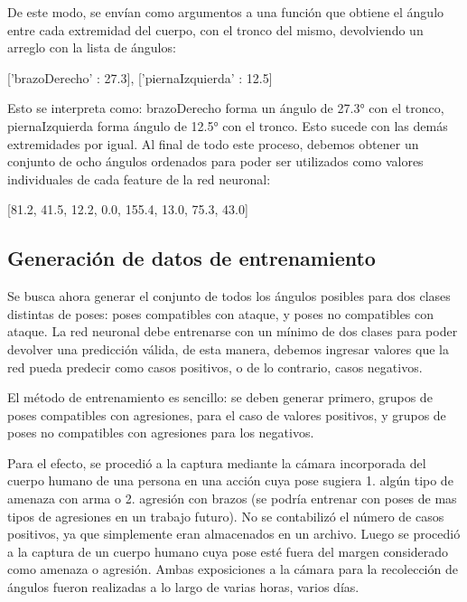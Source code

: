 \documentclass[a4paper,12pt,oneside,spanish]{book}
\begin{document}
De este modo, se envían como argumentos a una función que obtiene el ángulo entre cada extremidad del cuerpo, con el tronco del mismo, devolviendo un arreglo con la lista de ángulos:
\begin{center}
	{\footnotesize ['brazoDerecho' : 27.3], ['piernaIzquierda' : 12.5]}\\	
\end{center}
Esto se interpreta como: brazoDerecho forma un ángulo de 27.3° con el tronco, piernaIzquierda forma ángulo de 12.5° con el tronco. Esto sucede con las demás extremidades por igual. Al final de todo este proceso, debemos obtener un conjunto de ocho ángulos ordenados para poder ser utilizados como valores individuales de cada feature de la red neuronal:
\begin{center}
	{\footnotesize [81.2, 41.5, 12.2, 0.0, 155.4, 13.0, 75.3, 43.0]}\\	
\end{center}

\subsection{Generación de datos de entrenamiento}
Se busca ahora generar el conjunto de todos los ángulos posibles para dos clases distintas de poses: poses compatibles con ataque, y poses no compatibles con ataque. La red neuronal debe entrenarse con un mínimo de dos clases para poder devolver una predicción válida, de esta manera, debemos ingresar valores que la red pueda predecir como casos positivos, o de lo contrario, casos negativos.\par

El método de entrenamiento es sencillo: se deben generar primero, grupos de poses compatibles con agresiones, para el caso de valores positivos, y grupos de poses no compatibles con agresiones para los negativos.\par

Para el efecto, se procedió a la captura mediante la cámara incorporada del cuerpo humano de una persona en una acción cuya pose sugiera 1. algún tipo de amenaza con arma o 2. agresión con brazos (se podría entrenar con poses de mas tipos de agresiones en un trabajo futuro). No se contabilizó el número de casos positivos, ya que simplemente eran almacenados en un archivo. Luego se procedió a la captura de un cuerpo humano cuya pose esté fuera del margen considerado como amenaza o agresión. Ambas exposiciones a la cámara para la recolección de ángulos fueron realizadas a lo largo de varias horas, varios días.\par
\end{document}
